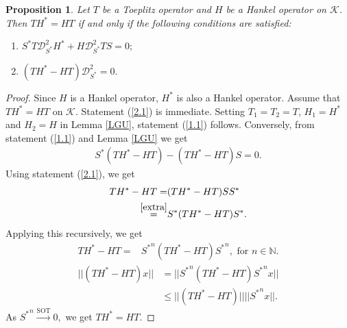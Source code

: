\documentclass[12pt, reqno]{amsart}
\newtheorem{proposition}[theorem]{Proposition}
\theoremstyle{definition}
\theoremstyle{remark}
\numberwithin{equation}{section}
\newcommand{\ck}{\mathcal{K}}
\begin{document}
    \begin{proposition}\label{prop1}
        Let $T$ be a Toeplitz operator and $H$ be a Hankel operator
        on $\ck$. Then $TH^* = HT$ if and only if the following conditions are satisfied:
        \begin{enumerate}
            \item  $S^*T\mathcal{D}^2_{S^*} H^*+H\mathcal{D}^2_{S^*} TS=0;$\label{1.1}
            \item $(TH^*-HT)\mathcal{D}^2_{S^*}=0.$\label{2.1}
        \end{enumerate}
        \end{proposition}
        \begin{proof}
            Since $H$ is a Hankel operator, $H^*$ is also a Hankel operator. Assume that $TH^*=HT$ on $\ck.$ Statement (\ref{2.1}) is immediate. Setting $T_1=T_2=T$, $H_1=H^*$ and $H_2=H$ in Lemma \ref{LGU}, statement (\ref{1.1}) follows.
            Conversely, from statement (\ref{1.1}) and Lemma \ref{LGU} we get
            \begin{align}\label{extra}
                S^*(TH^*-HT)-(TH^*-HT)S=0.
            \end{align}
             Using statement (\ref{2.1}), we get
            \begin{align*}
                TH^*-HT=& (TH^*-HT)SS^*\\
                \overset{\eqref{extra}}{=}& S^*(TH^*-HT)S^*.
            \end{align*}
            Applying this recursively, we get
            \begin{align*}
                 TH^*-HT=&{S^*}^n(TH^*-HT){S^*}^n, \text{ for } n \in \mathbb{N}.
            \end{align*}
            \begin{align*}
                ||(TH^*-HT)x||&=||{S^*}^n(TH^*-HT){S^*}^nx||\\
                &\leq||(TH^*-HT)|| ||{S^*}^nx||.
            \end{align*}
            As ${S^*}^n \xrightarrow{\text{SOT}} 0,$ we get $TH^*=HT$.
            \end{proof}
    
\end{document}
